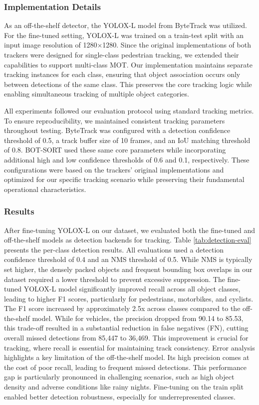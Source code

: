 \subsubsection{Implementation Details}
As an off-the-shelf detector, the YOLOX-L model from ByteTrack was utilized. For the fine-tuned setting, YOLOX-L was trained on a train-test split with an input image resolution of 1280×1280. Since the original implementations of both trackers were designed for single-class pedestrian tracking, we extended their capabilities to support multi-class MOT. Our implementation maintains separate tracking instances for each class, ensuring that object association occurs only between detections of the same class. This preserves the core tracking logic while enabling simultaneous tracking of multiple object categories.

All experiments followed our evaluation protocol using standard tracking metrics. To ensure reproducibility, we maintained consistent tracking parameters throughout testing. ByteTrack was configured with a detection confidence threshold of 0.5, a track buffer size of 10 frames, and an IoU matching threshold of 0.8. BOT-SORT used these same core parameters while incorporating additional high and low confidence thresholds of 0.6 and 0.1, respectively. These configurations were based on the trackers' original implementations and optimized for our specific tracking scenario while preserving their fundamental operational characteristics.


\subsubsection{Results}
After fine-tuning YOLOX-L on our dataset, we evaluated both the fine-tuned and off-the-shelf models as detection backends for tracking. Table \ref{tab:detection-eval} presents the per-class detection results. All evaluations used a detection confidence threshold of 0.4 and an NMS threshold of 0.5. While NMS is typically set higher, the densely packed objects and frequent bounding box overlaps in our dataset required a lower threshold to prevent excessive suppression. The fine-tuned YOLOX-L model significantly improved recall across all object classes, leading to higher F1 scores, particularly for pedestrians, motorbikes, and cyclists. The F1 score increased by approximately 2.5x across classes compared to the off-the-shelf model. While for vehicles, the precision dropped from 90.14 to 85.53, this trade-off resulted in a substantial reduction in false negatives (FN), cutting overall missed detections from 85,447 to 36,469. This improvement is crucial for tracking, where recall is essential for maintaining track consistency. Error analysis highlights a key limitation of the off-the-shelf model. Its high precision comes at the cost of poor recall, leading to frequent missed detections. This performance gap is particularly pronounced in challenging scenarios, such as high object density and adverse conditions like rainy nights. Fine-tuning on the train split enabled better detection robustness, especially for underrepresented classes.

